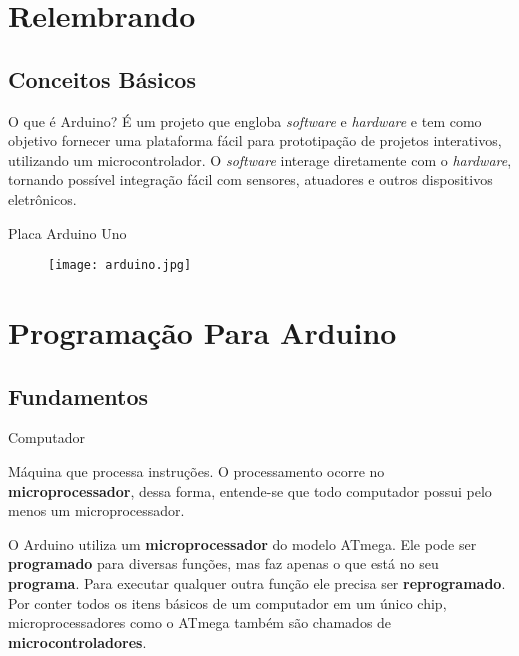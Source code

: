 \section{Relembrando}
\ncframesummary

\subsection*{Conceitos Básicos}
\begin{frame}{}
	\begin{block}{O que é Arduino?}
		É um projeto que engloba \textit{software} e \textit{hardware} e tem como objetivo fornecer uma plataforma fácil para prototipação de projetos interativos, utilizando um microcontrolador. O \textit{software} interage diretamente com o \textit{hardware}, tornando possível integração fácil com sensores, atuadores e outros dispositivos eletrônicos.
	\end{block}
\end{frame}

\begin{frame}{Placa Arduino Uno}
	\begin{figure}[H]
		\texttt{[image: arduino.jpg]}\footnotemark
	\end{figure}
	
\end{frame}

\section{Programação Para Arduino}
\ncframesummary

\subsection*{Fundamentos}
\begin{frame}{Computador}
	\begin{block}{}
		Máquina que processa instruções. O processamento ocorre no \textbf{microprocessador}, dessa forma, entende-se que todo computador possui pelo menos um microprocessador.
	\end{block}
\end{frame}

\begin{frame}{}
	\begin{block}{}
		O Arduino utiliza um \textbf{microprocessador} do modelo ATmega. Ele pode ser \textbf{programado} para diversas funções, mas faz apenas o que está no seu \textbf{programa}. Para executar qualquer outra função ele precisa ser \textbf{reprogramado}. Por conter todos os itens básicos de um computador em um único chip, microprocessadores como o ATmega também são chamados de \textbf{microcontroladores}.
	\end{block}
\end{frame}

